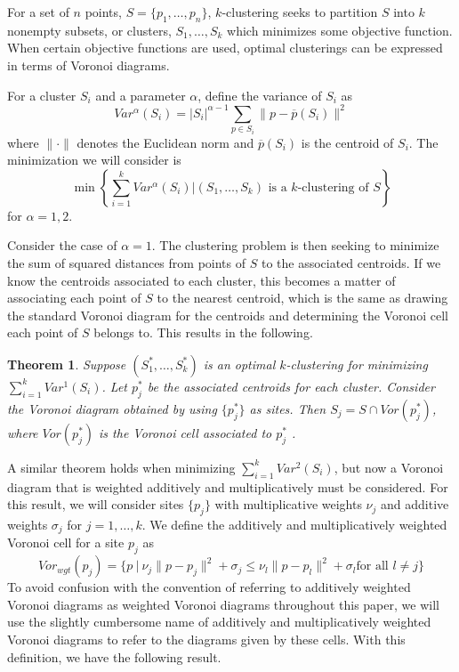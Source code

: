 \documentclass[a4paper, 11pt]{article}
\newtheorem{theorem}{Theorem}[section]
\begin{document}
For a set of $n$ points, $S = \{p_1, \dots, p_n \}$, $k$-clustering seeks to partition $S$ into $k$ nonempty subsets, or clusters, $S_1, \dots, S_k$ which minimizes some objective
function. When certain objective functions are used, optimal clusterings can be expressed in terms of Voronoi diagrams.

For a cluster $S_i$ and a
parameter $\alpha$, define
the variance of $S_i$ as
\begin{equation}
  Var^\alpha(S_i) = |S_i|^{\alpha-1} \sum_{p \in S_i} \| p - \overline{p}(S_i) \|^2
  \label{def:var}
\end{equation}
where $\| \cdot \|$ denotes the Euclidean norm and $\overline{p}(S_i)$ is the centroid of $S_i$. The minimization we will consider is
\begin{equation}
  \min \left\{ \sum_{i=1}^k Var^\alpha (S_i) | (S_1,\dots, S_k) \text{ is a $k$-clustering of } S \right\}
  \label{eq:cluster}
\end{equation}
for $\alpha = 1,2$.

Consider the case of $\alpha = 1$. The clustering problem is then seeking to minimize the sum of squared distances from points of $S$ to the
associated centroids. If we know the centroids associated to each cluster, this becomes a matter of associating each point of $S$ to the nearest
centroid, which is the same as drawing the standard Voronoi diagram for the centroids and determining the Voronoi cell each point of $S$ belongs to.
This results in the following.

\begin{theorem}
  \label{thm:var_1}
  Suppose $(S_1^\ast, \dots, S_k^\ast)$ is an optimal $k$-clustering for minimizing $\sum_{i=1}^k Var^1(S_i)$. Let $p_j^\ast$ be the associated
  centroids for each cluster. Consider the Voronoi diagram obtained by using $\{ p_j^\ast \}$ as sites. Then $S_j = S \cap Vor(p_j^\ast)$, where
  $Vor(p_j^\ast)$ is the Voronoi cell associated to $p_j^\ast$ \cite{inaba_clustering} .
\end{theorem}

A similar theorem holds when minimizing $\sum_{i=1}^k Var^2(S_i)$, but now a Voronoi diagram that is weighted additively and multiplicatively must be
considered. For this result, we will consider sites $\{ p_j \}$ with multiplicative weights $\nu_j$ and additive
weights $\sigma_j$ for $j=1,\dots, k$. We define the additively and multiplicatively weighted Voronoi cell for a site $p_j$ as
\begin{equation}
  Vor_{wgt}( p_j ) = \{ p \ | \ \nu_j \| p - p_j \|^2 + \sigma_j \leq \nu_l \| p - p_l \|^2 + \sigma_l \text{
    for all $l \neq j$} \}
  \label{def:wgt_vor}
\end{equation}
To avoid confusion with the convention of referring to additively weighted Voronoi diagrams as weighted Voronoi diagrams throughout this paper, we
will use the slightly cumbersome name of additively and multiplicatively weighted Voronoi diagrams to refer to the diagrams given by these cells. With
this definition, we have the following result.
\end{document}

